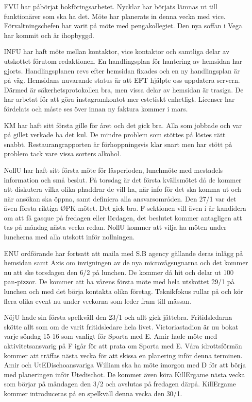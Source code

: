 \documentclass[10pt]{article}
\begin{document}
\begin{paragrafer}
\begin{paragrafer}
FVU har påbörjat bokföringsarbetet. Nycklar har börjats lämnas ut till funktionärer som ska ha det. Möte har planerats in denna vecka med vice. Förvaltningschefen har varit på möte med pengakollegiet. Den nya soffan i Vega har kommit och är ihopbyggd.

INFU har haft möte mellan kontaktor, vice kontaktor och samtliga delar av utskottet förutom redaktionen.
En handlingsplan för hantering av hemsidan har gjorts. Handlingsplanen revs efter hemsidan fixades och en ny handlingsplan är på väg.
Hemsidans nuvarande status är att EFT hjälpte oss uppdatera servern. Därmed är säkerhetsprotokollen bra, men vissa delar av hemsidan är trasiga.
De har arbetat för att göra instagramkontot mer estetiskt enhetligt.
Licenser har fördelats och måste ses över innan ny faktura kommer i mars.

KM har haft sitt första gille för året och det gick bra. Alla som jobbade och var på gillet verkade ha det kul. De mindre problem som stöttes på löstes rätt snabbt. Restaurangrapporten är förhoppningsvis klar snart men har stött på problem tack vare vissa sorters alkohol.

NollU har haft sitt första möte för läsperioden, lunchmöte med mestadels information och små beslut. På torsdag är det första kvällsmötet då de kommer att diskutera vilka olika phaddrar de vill ha, när info för det ska komma ut och när ansökan ska öppna, samt definiera alla ansvarsområden. 
Den 27/1 var det även första riktiga ØPK-mötet. Det gick bra. F-sektionen vill även i år kandidera om att få gasque på fredagen eller lördagen, det beslutet kommer antagligen att tas på måndag nästa vecka redan.
NollU kommer att vilja ha möten under luncherna med alla utskott inför nollningen.

ENU ordförande har fortsatt att maila med S.B agency gällande deras inlägg på hemsidan samt Axis om invigningen av de nya microvågsugnarna och det kommer nu att ske torsdagen den 6/2 på lunchen. De kommer då hit och delar ut 100 pan-pizzor.
De kommer att ha vårens första möte med hela utskottet 29/1 på lunchen och med det börja kontakta olika företag.
Teknikfokus rullar på och kör flera olika event nu under veckorna som leder fram till mässan.

NöjU hade sin första spelkväll den 23/1 och allt gick jättebra. Fritidsledarna skötte allt som om de varit fritidsledare hela livet.
Victoriastadion är nu bokat varje söndag 15-16 som vanligt för Sporta med E. Amir hade möte med aktivitetsansvarig på F igår för att prata om Sporta med E. Våra idrottsförmän kommer att träffas nästa vecka för att skissa en planering inför denna terminen. 
Amir och UtEDischoansvariga William ska ha möte imorgon med D för att börja med planeringen inför Utedischot.
De kommer även köra KillErgame nästa vecka som börjar på måndagen den 3/2 och avslutas på fredagen därpå. KillErgame kommer introduceras på en spelkväll denna vecka den 30/1.


\end{paragrafer}
\end{paragrafer}
\end{document}

